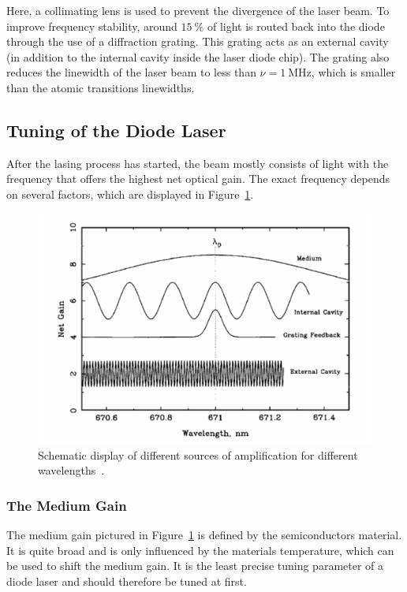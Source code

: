 \noindent
Here, a collimating lens is used to prevent the divergence of the laser beam. To improve frequency stability,
around $\SI{15}{\percent}$ of light is routed back into the diode through the use of a diffraction grating.
This grating acts as an external cavity (in addition to the internal cavity inside the laser diode chip).
The grating also reduces the linewidth of the laser beam to less than $\nu = \SI{1}{\mega\hertz}$, which is
smaller than the atomic transitions linewidths.

\subsection{Tuning of the Diode Laser}
\label{sec:tuning}
After the lasing process has started, the beam mostly consists of light with the frequency that offers the highest
net optical gain. The exact frequency depends on several factors, which are displayed in
Figure~\ref{fig:diode-frequency}.
\begin{figure}
  \centering
  \includegraphics[scale=0.35]{./pictures/Diode-frequency.png}
  \caption{Schematic display of different sources of amplification for different wavelengths~\cite{teachspin}.}
  \label{fig:diode-frequency}
\end{figure}
\subsubsection{The Medium Gain}
\label{sec:mediumgain}
The medium gain pictured in Figure~\ref{fig:diode-frequency} is defined by the semiconductors material. It is
quite broad and is only influenced by the materials temperature, which can be used to shift the medium gain.
It is the least precise tuning parameter of a diode laser and should therefore be tuned at first.
